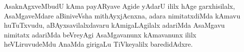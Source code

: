 \begin{artha}
AsaknAgxveMbudU kAma payARyave Agide yAdarU ililx hAge garxhisilalx,
AsaMgaveMdare aBiniveVsha mithAyxjAcnxna, adara nimitatxdiMda kAmavu
huTuTxvudu, aBAyxsavilalxdavaru kAmigaLAgilalx adariMda AsaMgavu
nimitatx adariMda beVreyAgi AsaMgavanunx kAmavanunx ililx
heVLiruvudeMdu AnaMda girigaLu TiVkeyalilx baredidAdxre.
\end{artha}

\begin{artha}

\end{artha}

\begin{artha}

\end{artha}

\begin{artha}

\end{artha}

\begin{artha}

\end{artha}

\begin{artha}

\end{artha}

\begin{artha}

\end{artha}

\begin{artha}

\end{artha}

\begin{artha}

\end{artha}

\begin{artha}

\end{artha}

\begin{artha}

\end{artha}

\begin{artha}

\end{artha}

\begin{artha}

\end{artha}

